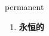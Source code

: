 
\begin{frame}
{\huge permanent}
\begin{center}
\begin{enumerate}\Large
  \item \textbf{永恒的}
\end{enumerate}
\end{center}
\end{frame}
